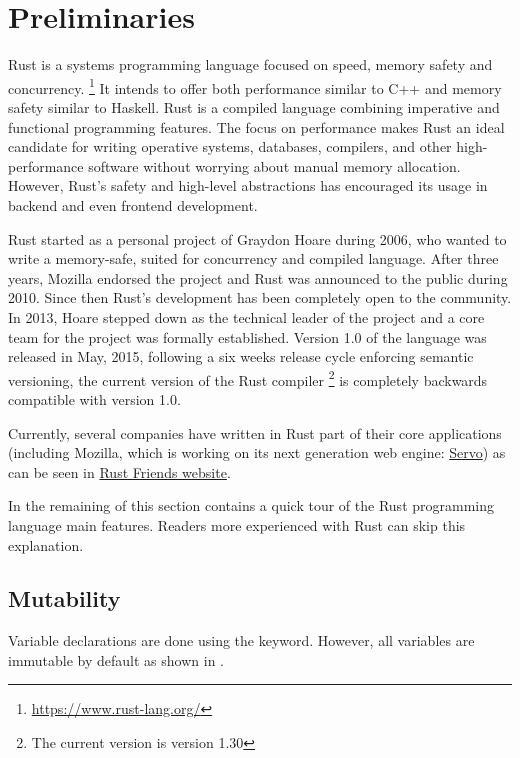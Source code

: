 \chapter{Preliminaries}

\label{chap:preliminaries}

Rust is a systems programming language focused on speed, memory safety and
concurrency. \footnote{\url{https://www.rust-lang.org/}}  It intends to offer
both performance similar to C++ and memory safety similar to Haskell. Rust is a
compiled language combining imperative and functional programming features. The
focus on performance makes Rust an ideal candidate for writing operative
systems, databases, compilers, and other high-performance software without
worrying about manual memory allocation. However, Rust's safety and high-level
abstractions has encouraged its usage in backend and even frontend development. 

Rust started as a personal project of Graydon Hoare during 2006, who wanted to
write a memory-safe, suited for concurrency and compiled language. After three
years, Mozilla endorsed the project and Rust was announced to the public during
2010. Since then Rust's development has been completely open to the community.
In 2013, Hoare stepped down as the technical leader of the project and a core
team for the project was formally established. \cite{steve_acm} Version 1.0 of
the language was released in May, 2015, following a six weeks release cycle
enforcing semantic versioning, the current version of the Rust compiler
\footnote{The current version is version 1.30} is completely backwards
compatible with version 1.0.

Currently, several companies have written in Rust part of their core
applications (including Mozilla, which is working on its next generation web
engine: \href{https://servo.org/}{Servo}) as can be seen in
\href{https://www.rust-lang.org/en-US/friends.html}{Rust Friends website}.

In the remaining of this section contains a quick tour of the Rust programming
language main features. Readers more experienced with Rust can skip this
explanation.

\section{Mutability}

Variable declarations are done using the  keyword. However, all
variables are immutable by default as shown in .

